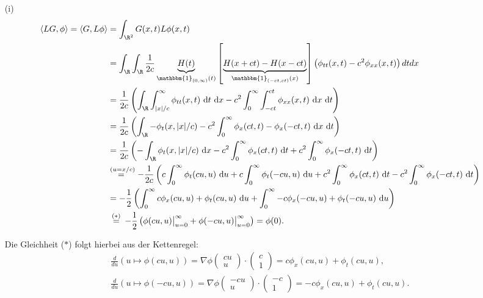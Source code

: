 \begin{solution}

\phantom{}
\begin{itemize}
    \item[(i)] \begin{align*}
    \langle LG, \phi \rangle = \langle G, L\phi \rangle &=
    \int_{\R^2} G(x, t) L\phi(x, t) \\
     &= \int_{\R} \int_{\R} \frac{1}{2c} \underbrace{H(t)}_{\mathbbm{1}_{(0, \infty)}(t)}
    \left[ \underbrace{H(x+ct) - H(x-ct)}_{\mathbbm{1}_{(-ct, ct)}(x)}\right]
    \left( \phi_{tt}(x, t) - c^2 \phi_{xx}(x, t) \right) dt dx \\
    &= \frac{1}{2c} \left(
    \int_\R \int_{|x|/c}^\infty \phi_{tt}(x, t) \mathrm{~d}t \mathrm{~d}x
    - c^2 \int_0^\infty \int_{-ct}^{ct} \phi_{xx}(x, t) \mathrm{~d}x \mathrm{~d}t \right)\\
    &= \frac{1}{2c} \left( \int_\R - \phi_t(x, |x|/c)
    - c^2 \int_0^\infty \phi_x(ct, t)  - \phi_x(-ct, t) \mathrm{~d}x\mathrm{~d}t \right)\\
    &= \frac{1}{2c}\left(- \int_\R \phi_t(x, |x|/c) \mathrm{~d}x
    - c^2 \int_0^\infty \phi_x(ct, t) \mathrm{~d}t + c^2
    \int_0^\infty \phi_x(-ct, t) \mathrm{~d}t\right)\\
    &\stackrel{(u = x/c)}{=~} - \frac{1}{2c} \left(c \int_0^\infty \phi_t(cu, u) \mathrm{~d}u + c
    \int_0^\infty \phi_t(-cu, u) \mathrm{~d}u + c^2 \int_0^\infty \phi_x(ct, t) \mathrm{~d}t
    - c^2\int_0^\infty \phi_x(-ct, t) \mathrm{~d}t\right) \\
    &= - \frac{1}{2} \left( \int_0^\infty c \phi_x(cu, u) + \phi_t(cu, u) \mathrm{~d}u +
    \int_0^\infty - c \phi_x(-cu, u) + \phi_t(-cu, u) \mathrm{~d}u \right) \\
    &\stackrel{(\ast)}{~=~} - \frac{1}{2}
    \left(\phi(cu, u) \big|_{u=0}^\infty + \phi(-cu, u) \big|_{u=0}^\infty \right) = \phi(0).
\end{align*}

Die Gleichheit ($\ast$) folgt hierbei aus der Kettenregel:
\begin{align*}
    \frac{d}{du} \left( u \mapsto \phi(cu, u) \right) = \nabla\phi\begin{pmatrix}cu\\u\end{pmatrix} \cdot \begin{pmatrix}c\\1\end{pmatrix} = c \phi_x(cu, u) + \phi_t (cu, u), \\
    \frac{d}{du} \left( u \mapsto \phi(-cu, u) \right) = \nabla\phi\begin{pmatrix}-cu\\u\end{pmatrix} \cdot \begin{pmatrix}-c\\1\end{pmatrix} = - c \phi_x(cu, u) + \phi_t (cu, u).
\end{align*}


\end{itemize}
\end{solution}

